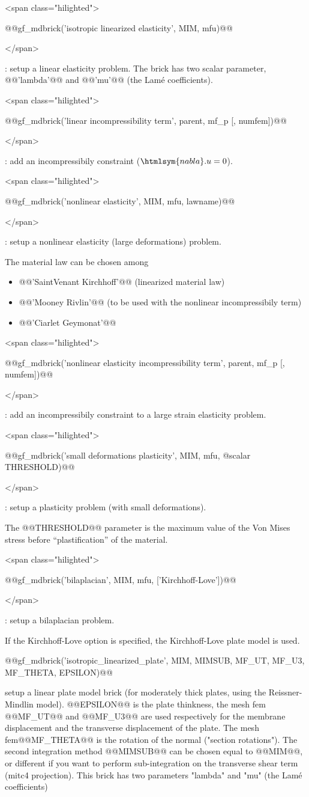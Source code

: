 \documentclass[11pt,a4paper]{article}
\newcommand{\nabla}{\htmlsym{nabla}}%
\newcommand{\hil}[1]{\begin{rawxml}<span class="hilighted">\end{rawxml}#1\begin{rawxml}</span>\end{rawxml}}
\newcommand{\sep}[1]{\medskip\par\hil{#1}}
\newcommand{\hil}[1]{\colorbox{sepbg}{#1}}
\newcommand{\sep}[1]{\medskip\par#1}
\newcommand{\mf}{mesh fem\xspace}
\begin{document}
\begin{cmddescription}
\sep{@@gf_mdbrick('isotropic linearized elasticity', MIM, mfu)@@}
 : setup a linear elasticity problem.
      The brick has two scalar parameter, @@'lambda'@@ and @@'mu'@@ (the Lam\'e coefficients).

\sep{@@gf_mdbrick('linear incompressibility term', parent, mf_p [, numfem])@@} :
add an incompressibily constraint ($\nabla.u = 0$).

\sep{@@gf_mdbrick('nonlinear elasticity', MIM, mfu, lawname)@@} : 
setup a nonlinear elasticity (large deformations) problem.

The material law can be chosen among
\begin{itemize}
  \item @@'SaintVenant Kirchhoff'@@ (linearized material law)
  \item @@'Mooney Rivlin'@@ (to be used with the nonlinear incompressibily term)
  \item @@'Ciarlet Geymonat'@@
\end{itemize}


\sep{@@gf_mdbrick('nonlinear elasticity incompressibility term', parent, mf_p [, numfem])@@} :
add an incompressibily constraint to a large strain elasticity problem.

\sep{@@gf_mdbrick('small deformations plasticity', MIM, mfu, @scalar THRESHOLD)@@} : 
setup a plasticity problem (with small deformations).

The @@THRESHOLD@@ parameter is the maximum value of the Von Mises
stress before ``plastification'' of the material.

\sep{@@gf_mdbrick('bilaplacian', MIM, mfu, ['Kirchhoff-Love'])@@}
 : setup a bilaplacian problem.

If the Kirchhoff-Love option is specified, the Kirchhoff-Love
plate model is used.

@@gf_mdbrick('isotropic_linearized_plate', MIM, MIMSUB, MF_UT, MF_U3, MF_THETA, EPSILON)@@

setup a linear plate model brick (for moderately thick plates, using
the Reissner-Mindlin model). @@EPSILON@@ is the plate thinkness, the \mf
@@MF_UT@@ and @@MF_U3@@ are used respectively for the membrane displacement
and the transverse displacement of the plate. The \mf @@MF_THETA@@ is the
rotation of the normal ("section rotations").  The second integration
method @@MIMSUB@@ can be chosen equal to @@MIM@@, or different if you want to
perform sub-integration on the transverse shear term (mitc4
projection).  This brick has two parameters "lambda" and "mu" (the Lam\'e
coefficients)


\end{cmddescription}
\end{document}
